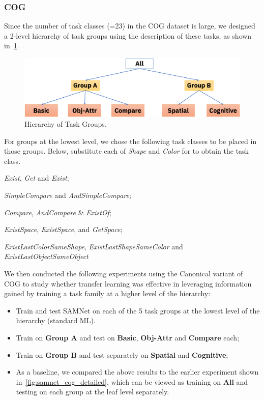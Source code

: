 \subsubsection{COG}
\label{sec:reasoning-cog}
Since the number of task classes (=23) in the COG dataset is large, we designed a 2-level hierarchy of task groups using the
description of these tasks, as shown in~\cref{fig:task-groups}.

\begin{figure}[htb]
	\centering
	\includegraphics[width=\columnwidth]{img/architecture/hierarchy}
	\caption{Hierarchy of Task Groups.}
	\label{fig:task-groups}
\end{figure}

\bigskip

For groups at the lowest level, we chose the following task classes to be placed in those groups.
Below, substitute each of \textit{Shape} and \textit{Color} for  \uX{} to obtain the task class.
\begin{description}
	\compresslist
	\item[Basic:] \textit{Exist}\uX, \textit{Get}\uX{} and \textit{Exist};
	\item[Obj-Attr:] \emph{SimpleCompare}\uX{} and \textit{AndSimpleCompare}\uX;
	\item[Compare:] \textit{Compare}\uX,  \textit{AndCompare}\uX{} \& \textit{Exist}\uX\textit{Of};
	\item[Spatial:] \textit{ExistSpace}, \textit{Exist}\uX\textit{Space}, and \textit{Get}\uX\textit{Space};
	\item[Cognitive:] \textit{ExistLastColorSameShape}, \textit{ExistLastShapeSameColor} and \textit{ExistLastObjectSameObject}
\end{description}

We then conducted the following experiments using the Canonical variant of COG to study 
whether transfer learning was effective in leveraging information gained by training a task family at a higher level
of the hierarchy:
 \begin{itemize}
 	\compresslist
	\item Train and test SAMNet on each of the 5 task groups at the lowest level of the hierarchy (standard ML). 
	\item Train on \textbf{Group A} and test on \textbf{Basic}, \textbf{Obj-Attr} and \textbf{Compare} each;
	\item Train on \textbf{Group B} and test separately on \textbf{Spatial} and \textbf{Cognitive};
	\item As a baseline, we compared the above results to the earlier experiment shown in~\cref{fig:samnet_cog_detailed}, which
	can be viewed as training on \textbf{All} and testing on each group at the leaf level separately.
\end{itemize}

